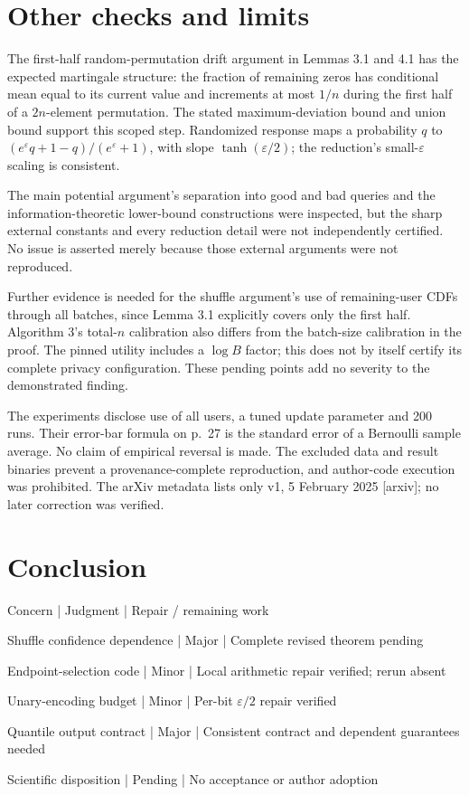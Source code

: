 \documentclass[10pt]{article}
\begin{document}
\section*{Other checks and limits}
The first-half random-permutation drift argument in Lemmas 3.1 and 4.1 has the expected martingale structure: the fraction of remaining zeros has conditional mean equal to its current value and increments at most \(1/n\) during the first half of a \(2n\)-element permutation. The stated maximum-deviation bound and union bound support this scoped step. Randomized response maps a probability \(q\) to \((e^\varepsilon q+1-q)/(e^\varepsilon+1)\), with slope \(\tanh(\varepsilon/2)\); the reduction’s small-\(\varepsilon\) scaling is consistent.\par
The main potential argument’s separation into good and bad queries and the information-theoretic lower-bound constructions were inspected, but the sharp external constants and every reduction detail were not independently certified. No issue is asserted merely because those external arguments were not reproduced.\par
Further evidence is needed for the shuffle argument’s use of remaining-user CDFs through all batches, since Lemma 3.1 explicitly covers only the first half. Algorithm 3’s total-\(n\) calibration also differs from the batch-size calibration in the proof. The pinned utility includes a \(\log B\) factor; this does not by itself certify its complete privacy configuration. These pending points add no severity to the demonstrated finding.\par
The experiments disclose use of all users, a tuned update parameter and 200 runs. Their error-bar formula on p. 27 is the standard error of a Bernoulli sample average. No claim of empirical reversal is made. The excluded data and result binaries prevent a provenance-complete reproduction, and author-code execution was prohibited. The arXiv metadata lists only v1, 5 February 2025 [arxiv]; no later correction was verified.\par
\section*{Conclusion}
Concern | Judgment | Repair / remaining work\par
Shuffle confidence dependence | Major | Complete revised theorem pending\par
Endpoint-selection code | Minor | Local arithmetic repair verified; rerun absent\par
Unary-encoding budget | Minor | Per-bit \(\varepsilon/2\) repair verified\par
Quantile output contract | Major | Consistent contract and dependent guarantees needed\par
Scientific disposition | Pending | No acceptance or author adoption\par
\end{document}
